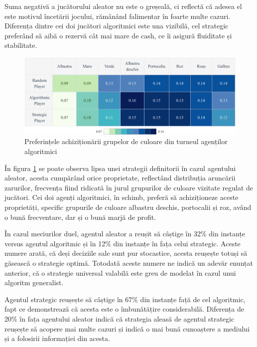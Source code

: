 Suma negativă a jucătorului aleator nu este o greșeală, ci reflectă că adesea el este motivul încetării jocului, rămânând falimentar în foarte multe cazuri. Diferența dintre cei doi jucători algoritmici este una vizibilă, cel strategic preferând să aibă o rezervă cât mai mare de cash, ce îi asigură fluiditate și stabilitate.

\begin{figure}[H]
    \centering
    \includegraphics[width=16cm]{images/algorithmic_tournament_property_preferences.png}
    \caption{Preferințele achiziționării grupelor de culoare din turneul agenților algoritmici}
    \label{fig:tournament-results-algorithmic-property-group-preferences}
\end{figure}

În figura \ref{fig:tournament-results-algorithmic-property-group-preferences} se poate observa lipsa unei strategii definitorii în cazul agentului aleator, acesta cumpărând orice proprietate, reflectând distribuția aruncării zarurilor, frecvența fiind ridicată în jurul grupurilor de culoare vizitate regulat de jucători. Cei doi agenți algoritmici, în schimb, preferă să achiziționeze aceste proprietăți, specific grupurile de culoare albastru deschis, portocalii și roz, având o bună frecventare, dar și o bună marjă de profit.

În cazul meciurilor duel, agentul aleator a reușit să câștige în 32\% din instanțe versus agentul algoritmic și în 12\% din instanțe în fața celui strategic. Aceste numere arată, că deși deciziile sale sunt pur stocastice, acesta reușește totuși să găsească o strategie optimă. Totodată aceste numere ne indică un adevăr enunțat anterior, că o strategie universal valabilă este greu de modelat în cazul unui algoritm generalist.

Agentul strategic reușește să câștige în 67\% din instanțe față de cel algoritmic, fapt ce demonstrează că acesta este o îmbunătățire considerabilă. Diferența de 20\% în fața agentului aleator indică că strategia aleasă de agentul strategic reușește să acopere mai multe cazuri și indică o mai bună cunoaștere a mediului și a folosirii informației din acesta.

